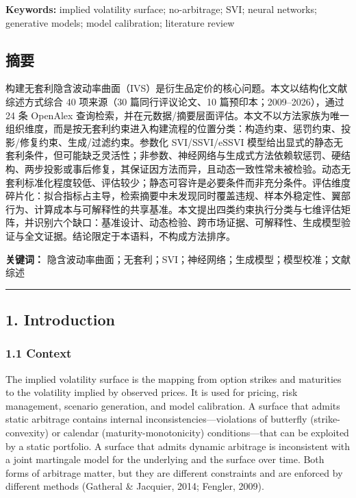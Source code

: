 \documentclass[11pt]{article}
\begin{document}
\textbf{Keywords:} implied volatility surface; no-arbitrage; SVI; neural networks; generative models; model calibration; literature review

\subsection*{摘要}
构建无套利隐含波动率曲面（IVS）是衍生品定价的核心问题。本文以结构化文献综述方式综合 40 项来源（30 篇同行评议论文、10 篇预印本；2009–2026），通过 24 条 OpenAlex 查询检索，并在元数据/摘要层面评估。本文不以方法家族为唯一组织维度，而是按无套利约束进入构建流程的位置分类：构造约束、惩罚约束、投影/修复约束、生成/过滤约束。参数化 SVI/SSVI/eSSVI 模型给出显式的静态无套利条件，但可能缺乏灵活性；非参数、神经网络与生成式方法依赖软惩罚、硬结构、两步投影或事后修复，其保证因方法而异，且动态一致性常未被检验。动态无套利标准化程度较低、评估较少；静态可容许是必要条件而非充分条件。评估维度碎片化：拟合指标占主导，检索摘要中未发现同时覆盖违规、样本外稳定性、翼部行为、计算成本与可解释性的共享基准。本文提出四类约束执行分类与七维评估矩阵，并识别六个缺口：基准设计、动态检验、跨市场证据、可解释性、生成模型验证与全文证据。结论限定于本语料，不构成方法排序。

\textbf{关键词：} 隐含波动率曲面；无套利；SVI；神经网络；生成模型；模型校准；文献综述

\par\medskip\hrule\medskip
\subsection*{1. Introduction}
\subsubsection*{1.1 Context}
The implied volatility surface is the mapping from option strikes and maturities to the volatility implied by observed prices. It is used for pricing, risk management, scenario generation, and model calibration. A surface that admits static arbitrage contains internal inconsistencies—violations of butterfly (strike-convexity) or calendar (maturity-monotonicity) conditions—that can be exploited by a static portfolio. A surface that admits dynamic arbitrage is inconsistent with a joint martingale model for the underlying and the surface over time. Both forms of arbitrage matter, but they are different constraints and are enforced by different methods (Gatheral \& Jacquier, 2014; Fengler, 2009).
\end{document}
